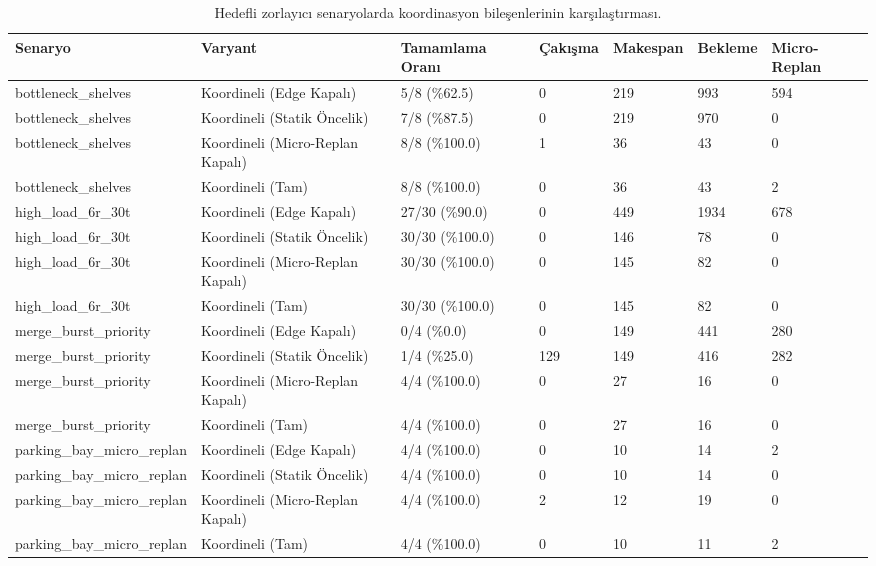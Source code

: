 \begin{table}[t]
\centering
\small
\begin{tabular}{lllllll}
\hline
Senaryo & Varyant & Tamamlama Oranı & Çakışma & Makespan & Bekleme & Micro-Replan \\
\hline
bottleneck\_shelves & Koordineli (Edge Kapalı) & 5/8 (\%62.5) & 0 & 219 & 993 & 594 \\
bottleneck\_shelves & Koordineli (Statik Öncelik) & 7/8 (\%87.5) & 0 & 219 & 970 & 0 \\
bottleneck\_shelves & Koordineli (Micro-Replan Kapalı) & 8/8 (\%100.0) & 1 & 36 & 43 & 0 \\
bottleneck\_shelves & Koordineli (Tam) & 8/8 (\%100.0) & 0 & 36 & 43 & 2 \\
high\_load\_6r\_30t & Koordineli (Edge Kapalı) & 27/30 (\%90.0) & 0 & 449 & 1934 & 678 \\
high\_load\_6r\_30t & Koordineli (Statik Öncelik) & 30/30 (\%100.0) & 0 & 146 & 78 & 0 \\
high\_load\_6r\_30t & Koordineli (Micro-Replan Kapalı) & 30/30 (\%100.0) & 0 & 145 & 82 & 0 \\
high\_load\_6r\_30t & Koordineli (Tam) & 30/30 (\%100.0) & 0 & 145 & 82 & 0 \\
merge\_burst\_priority & Koordineli (Edge Kapalı) & 0/4 (\%0.0) & 0 & 149 & 441 & 280 \\
merge\_burst\_priority & Koordineli (Statik Öncelik) & 1/4 (\%25.0) & 129 & 149 & 416 & 282 \\
merge\_burst\_priority & Koordineli (Micro-Replan Kapalı) & 4/4 (\%100.0) & 0 & 27 & 16 & 0 \\
merge\_burst\_priority & Koordineli (Tam) & 4/4 (\%100.0) & 0 & 27 & 16 & 0 \\
parking\_bay\_micro\_replan & Koordineli (Edge Kapalı) & 4/4 (\%100.0) & 0 & 10 & 14 & 2 \\
parking\_bay\_micro\_replan & Koordineli (Statik Öncelik) & 4/4 (\%100.0) & 0 & 10 & 14 & 0 \\
parking\_bay\_micro\_replan & Koordineli (Micro-Replan Kapalı) & 4/4 (\%100.0) & 2 & 12 & 19 & 0 \\
parking\_bay\_micro\_replan & Koordineli (Tam) & 4/4 (\%100.0) & 0 & 10 & 11 & 2 \\
\hline
\end{tabular}
\caption{Hedefli zorlayıcı senaryolarda koordinasyon bileşenlerinin karşılaştırması.}
\label{tab:coordination_ablation}
\end{table}
